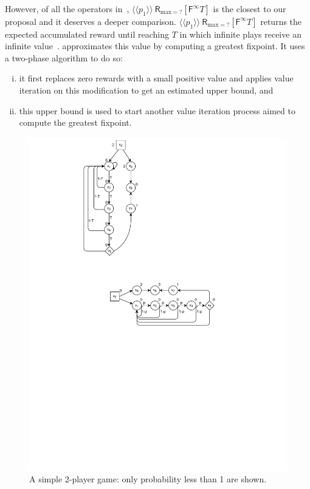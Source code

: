 However, of all the operators in~\cite{DBLP:journals/fmsd/ChenFKPS13,SvorenovaKwiatkowska16,DBLP:conf/cav/KwiatkowskaN0S20}, $\langle \langle p_1 \rangle \rangle \ \textsf{R}_{\text{max}{=}?}[\textsf{F}^{\infty} T]$ is the closest to our proposal and it deserves a deeper comparison.  $\langle \langle p_1 \rangle \rangle \ \textsf{R}_{\text{max}{=}?}[\textsf{F}^{\infty} T]$ returns the expected accumulated reward until reaching $T$ in which infinite plays receive an infinite value~\cite{DBLP:journals/fmsd/ChenFKPS13,DBLP:conf/cav/KwiatkowskaN0S20}.
{\Prism} approximates this value by computing a greatest fixpoint.  It uses a two-phase algorithm to do so:
\begin{enumerate}[(i)]
\item%
  it first replaces zero rewards with a small positive value and applies value iteration on this modification to get an estimated upper bound, and
\item%
  this upper bound is used to start another value iteration process aimed to compute the greatest fixpoint.
\end{enumerate}
%
\begin{figure}
\vspace{-4ex}
\centering
\includegraphics[scale=0.60]{Figs/prism-cex-1-horiz.pdf}%
\caption{A simple 2-player game: only probability less than 1 are shown.} \label{fig:prism-cex-1}
\end{figure}
